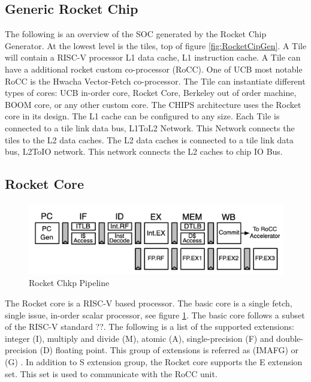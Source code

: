 \documentclass[../main.tex]{subfiles}
\begin{document}
\subsection{Generic Rocket Chip}
The following is an overview of the SOC generated by the Rocket Chip Generator. At the lowest level is the tiles, top of figure \ref{fig:RocketCipGen}. A Tile will contain a RISC-V processor L1 data cache, L1 instruction cache. A Tile can have a additional rocket custom co-processor (RoCC). One of UCB most notable RoCC is the Hwacha Vector-Fetch co-processor\cite{HwachaPaper}. The Tile can instantiate different types of cores: UCB in-order core, Rocket Core, Berkeley out of order machine, BOOM core, or any other custom core. The CHIPS architecture uses the Rocket core in its design. The L1 cache can be configured to any size. Each Tile is connected to a tile link data bus, L1ToL2 Network. This Network connects the tiles to the L2 data caches. The L2 data caches is connected to a tile link data bus, L2ToIO network. This network connects the L2 caches to chip IO Bus.


\subsection{Rocket Core}
\begin{figure}
    \centering
    \includegraphics[scale=.4]{pngs/RocketPipeline.png}
    \caption{Rocket Chkp Pipeline\cite{Asanović:EECS-2016-17}}
    \label{fig:RocketCipFlow}
\end{figure}
The Rocket core is a RISC-V based processor. The basic core is a single fetch, single issue, in-order scalar processor, see figure \ref{fig:RocketCipFlow}. The basic core follows a subset of the RISC-V standard ??. The following is a list of the supported extensions: integer (I), multiply and divide (M), atomic (A), single-precision (F) and double-precision (D) floating point. This group of extensions is referred as (IMAFG) or (G) \cite{Asanović:EECS-2016-17}. In addition to S extension group, the Rocket core supports the E extension set. This set is used to communicate with the RoCC unit. %
\end{document}
